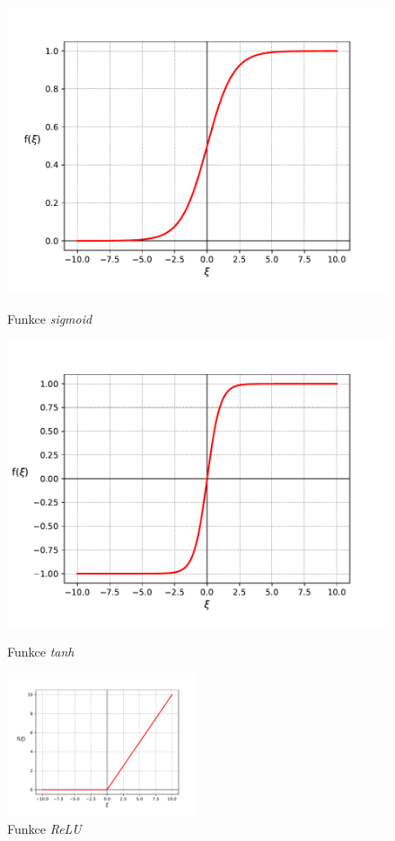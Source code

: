 \begin{figure}[!htb]
    \centering
    \begin{minipage}{0.5\textwidth}
        \centering
        \includegraphics[width=1\textwidth]{../img/graph_sigmoid.pdf}
        \caption{Funkce \emph{sigmoid}}
        \label{fig:graph_sigmoid}
    \end{minipage}%
    \begin{minipage}{0.5\textwidth}
        \centering
        \includegraphics[width=1\textwidth]{../img/graph_tanh.pdf}
        \caption{Funkce \emph{tanh}}
        \label{fig:graph_tanh}
    \end{minipage}
    \includegraphics[width=0.5\textwidth]{../img/graph_relu.pdf}
    \caption{Funkce \emph{ReLU}}
    \label{fig:graph_relu}
\end{figure}

